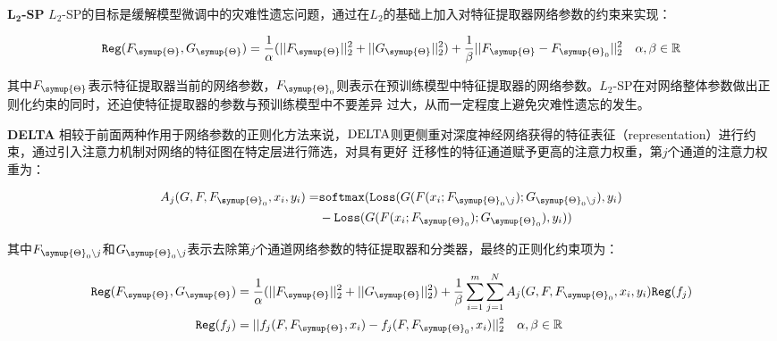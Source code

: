 \textbf{$\bm{L_2}$-SP } $L_2$-SP的目标是缓解模型微调中的灾难性遗忘问题，通过在$L_2$的基础上加入对特征提取器网络参数的约束来实现：

\begin{equation}
  \texttt{Reg} (F_{\symup{\Theta}}, G_{\symup{\Theta}}) = \frac{1}{\alpha} (\vert\vert F_{\symup{\Theta}} \vert\vert_2^2 + \vert\vert G_{\symup{\Theta}} \vert\vert_2^2) + \frac{1}{\beta} \vert\vert F_{\symup{\Theta}} - F_{{\symup{\Theta}}_0} \vert\vert_2^2 \quad \alpha, \beta \in \mathbb{R}
\end{equation}

其中$F_{\symup{\Theta}}$表示特征提取器当前的网络参数，$F_{{\symup{\Theta}}_0}$则表示在预训练模型中特征提取器的网络参数。$L_2$-SP在对网络整体参数做出正则化约束的同时，还迫使特征提取器的参数与预训练模型中不要差异
过大，从而一定程度上避免灾难性遗忘的发生。

\textbf{DELTA } 相较于前面两种作用于网络参数的正则化方法来说，$\rm{DELTA}$则更侧重对深度神经网络获得的特征表征（representation）进行约束，通过引入注意力机制对网络的特征图在特定层进行筛选，对具有更好
迁移性的特征通道赋予更高的注意力权重，第$j$个通道的注意力权重为：


\begin{equation}
\begin{aligned}
  A_j(G,F,F_{{\symup{\Theta}}_0},x_i,y_i) = &\texttt{softmax} (\texttt{Loss}(G(F(x_i; F_{{{\symup{\Theta}}_0}\backslash j});G_{{{\symup{\Theta}}_0}\backslash j}), y_i) \\ 
  &-\texttt{Loss}(G(F(x_i; F_{{\symup{\Theta}}_0});G_{{\symup{\Theta}}_0}), y_i)) \\
\end{aligned}
\end{equation}

其中$F_{{{\symup{\Theta}}_0}\backslash j}$和$G_{{{\symup{\Theta}}_0}\backslash j}$表示去除第$j$个通道网络参数的特征提取器和分类器，最终的正则化约束项为：

\begin{equation}
\begin{aligned}
  \texttt{Reg} (F_{\symup{\Theta}}, G_{\symup{\Theta}}) &= \frac{1}{\alpha} (\vert\vert F_{\symup{\Theta}} \vert\vert_2^2 + \vert\vert G_{\symup{\Theta}} \vert\vert_2^2) + \frac{1}{\beta} \sum_{i=1}^{m}\sum_{j=1}^{N} { 
    A_j(G,F,F_{{\symup{\Theta}}_0},x_i,y_i) \texttt{Reg}(f_j)}  \\
    \texttt{Reg}(f_j) &= \vert\vert f_j(F,F_{{\symup{\Theta}}}, x_i) - f_j(F,F_{{\symup{\Theta}}_0},x_i) \vert\vert_2^2 \quad \alpha, \beta \in \mathbb{R} \\
\end{aligned}
\end{equation}

